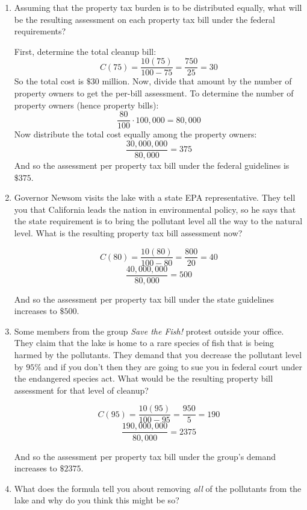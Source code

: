 \documentclass[letterpaper,12pt,fleqn]{article}
\begin{document}
\begin{enumerate}[label={(\alph*)}]
\item Assuming that the property tax burden is to be distributed equally, what will be the resulting assessment on each
  property tax bill under the federal requirements?

  \bigskip

  First, determine the total cleanup bill:
  \[C(75)=\frac{10(75)}{100-75}=\frac{750}{25}=30\]
  So the total cost is \(\$30\) million.  Now, divide that amount by the number of property owners to get the per-bill
  assessment.  To determine the number of property owners (hence property bills):
  \[\frac{80}{100}\cdot100,000=80,000\]
  Now distribute the total cost equally among the property owners:
  \[\frac{30,000,000}{80,000}=375\]
  And so the assessment per property tax bill under the federal guidelines is \(\$375\).
  
  \bigskip

\item Governor Newsom visits the lake with a state EPA representative.  They tell you that California leads the nation in
  environmental policy, so he says that the state requirement is to bring the pollutant level all the way to the natural
  level.  What is the resulting property tax bill assessment now?

  \[C(80)=\frac{10(80)}{100-80}=\frac{800}{20}=40\]
  \[\frac{40,000,000}{80,000}=500\]
  
  And so the assessment per property tax bill under the state guidelines increases to \(\$500\).

  \bigskip

\item Some members from the group \emph{Save the Fish!} protest outside your office.  They claim that the lake is home to a
  rare species of fish that is being harmed by the pollutants.  They demand that you decrease the pollutant level by \(95\%\)
  and if you don't then they are going to sue you in federal court under the endangered species act.  What would be the
  resulting property bill assessment for that level of cleanup?

  \[C(95)=\frac{10(95)}{100-95}=\frac{950}{5}=190\]
  \[\frac{190,000,000}{80,000}=2375\]
  
  And so the assessment per property tax bill under the group's demand increases to \(\$2375\).

  \bigskip
  
\item What does the formula tell you about removing \emph{all} of the pollutants from the lake and why do you think this
  might be so?


\end{enumerate}
\end{document}
